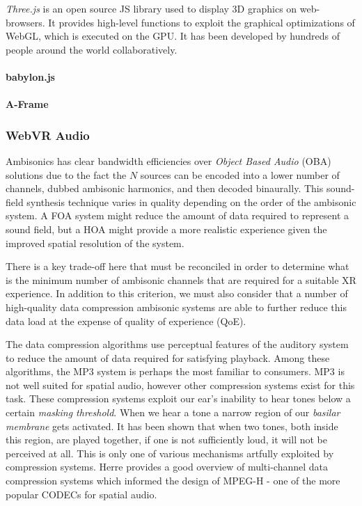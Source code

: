 \textit{Three.js} is an open source JS library used to display 3D graphics on web-browsers. It provides high-level functions to exploit the graphical optimizations of WebGL, which is executed on the GPU. It has been developed by hundreds of people around the world collaboratively. 



\paragraph{babylon.js}
\paragraph{A-Frame}






\subsubsection{WebVR Audio}

Ambisonics has clear bandwidth efficiencies over \textit{Object Based Audio} (OBA) solutions due to the fact the $N$ sources can be encoded into a lower number of channels, dubbed ambisonic harmonics, and then decoded binaurally. This sound-field synthesis technique varies in quality depending on the order of the ambisonic system. A FOA system might reduce the amount of data required to represent a sound field, but a HOA might provide a more realistic experience given the improved spatial resolution of the system.

There is a key trade-off here that must be reconciled in order to determine what is the minimum number of ambisonic channels that are required for a suitable XR experience. In addition to this criterion, we must also consider that a number of high-quality data compression ambisonic systems are able to further reduce this data load at the expense of quality of experience (QoE). 

The data compression algorithms use perceptual features of the auditory system to reduce the amount of data required for satisfying playback. Among these algorithms, the MP3 system is perhaps the most familiar to consumers. MP3 is not well suited for spatial audio, however other compression systems exist for this task. These compression systems exploit our ear's inability to hear tones below a certain \textit{masking threshold}. When we hear a tone a narrow region of our \textit{basilar membrane} gets activated. It has been shown that when two tones, both inside this region, are played together, if one is not sufficiently loud, it will not be perceived at all. This is only one of various mechanisms artfully exploited by compression systems. Herre \cite{herre2015mpeg} provides a good overview of multi-channel data compression systems which informed the design of MPEG-H - one of the more popular CODECs for spatial audio.

